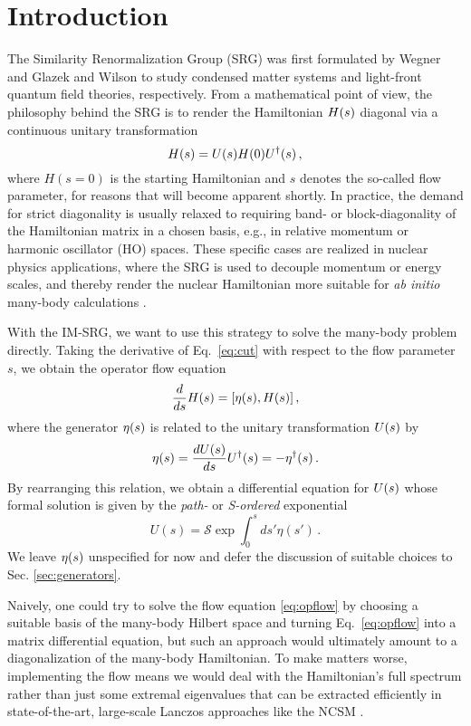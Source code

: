 \section{Introduction}

The Similarity Renormalization Group (SRG) was first formulated by
Wegner \cite{Wegner:1994dk} and Glazek and Wilson \cite{Glazek:1993il}
to study condensed matter systems and light-front quantum field
theories, respectively.  From a mathematical point of view, the
philosophy behind the SRG is to render the Hamiltonian $H(s)$
diagonal via a continuous unitary transformation
\begin{equation}\label{eq:cut}
  \HO(s)=\UO(s)\HO(0)\UUO(s)\,,
\end{equation}
where $H(s=0)$ is the starting Hamiltonian and $s$ denotes the so-called flow
parameter, for reasons that will become apparent shortly. In practice, the demand 
for strict diagonality is usually relaxed to requiring band- or block-diagonality 
of the Hamiltonian matrix in a chosen basis, e.g., in relative momentum or harmonic
oscillator (HO) spaces. These specific cases are realized in nuclear
physics applications, where the SRG is used to decouple momentum or
energy scales, and thereby render the nuclear Hamiltonian more
suitable for \emph{ab initio} many-body calculations
\cite{Bogner:2007kt,Bogner:2010pq,Jurgenson:2009bs,Hebeler:2012ly}.

With the IM-SRG, we want to use this strategy to solve the many-body problem directly. Taking the derivative of Eq.~\eqref{eq:cut}
with respect to the flow parameter $s$, we obtain the operator flow equation
\begin{equation}\label{eq:opflow}
  \totd{}{s}\HO(s) = \comm{\etaO(s)}{\HO(s)}\,,
\end{equation} 
where the generator $\eta(s)$ is related to the unitary transformation $U(s)$ by
\begin{equation}
  \eta(s)= \frac{d {U(s)}} {d {s}} U^{\dag}(s) = -\eta^{\dag}(s)\,.
\end{equation}
By rearranging this relation, we obtain a differential equation for $U(s)$ whose formal solution is given by the \emph{path-}
or \emph{S-ordered} exponential
\begin{equation}
  U(s) = \mathcal{S}\exp \int^s_0 ds' \eta(s')\,.
\end{equation}
We leave $\eta(s)$ unspecified for now and defer the discussion of suitable choices to Sec. \ref{sec:generators}. 

Naively, one could try to solve the flow equation \eqref{eq:opflow} by choosing a suitable basis of the many-body Hilbert space and turning Eq.~\eqref{eq:opflow} into a matrix differential equation, but such an approach would ultimately amount to a
diagonalization of the many-body Hamiltonian. To make matters worse, implementing the flow means we would deal with the Hamiltonian's full spectrum rather than just some extremal eigenvalues that can be extracted efficiently in state-of-the-art, large-scale Lanczos approaches like the NCSM \cite{Navratil:2000hf,Barrett:2013oq}.

